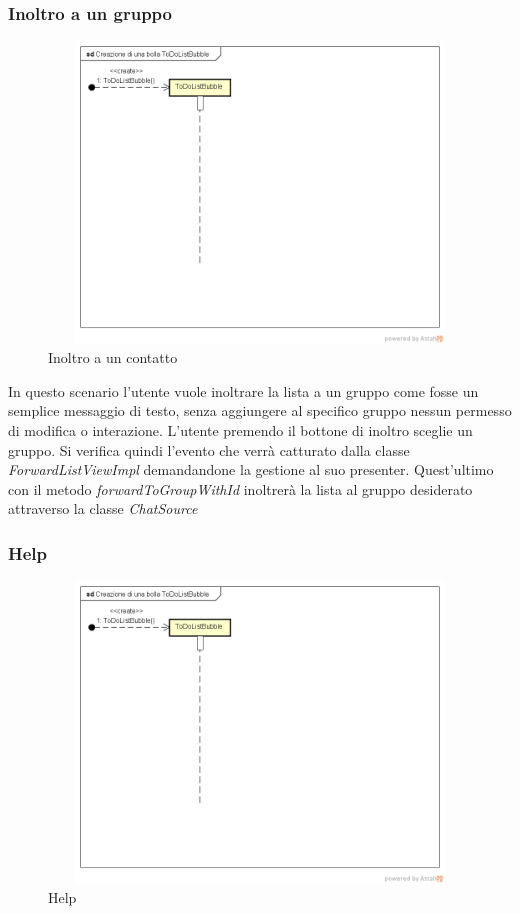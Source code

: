 \subsubsection{Inoltro a un gruppo}

\label{Inoltro a un contatto}
\begin{figure}[ht]
	\centering
	\includegraphics[width=12cm, height=8cm]{Sezioni/Diagrammi/img/Creazione di una bolla ToDoListBubble.png}
	\caption{Inoltro a un contatto}
	
\end{figure}

In questo scenario l'utente vuole inoltrare la lista a un gruppo come fosse un semplice messaggio di testo, senza aggiungere al specifico gruppo nessun permesso di modifica o interazione. L'utente premendo il bottone di inoltro sceglie un gruppo. Si verifica quindi l'evento che verrà catturato dalla classe \textit{ForwardListViewImpl} demandandone la gestione al suo presenter.
Quest'ultimo con il metodo \textit{forwardToGroupWithId} inoltrerà la lista al gruppo desiderato attraverso la classe \textit{ChatSource} 


\subsubsection{Help}

\label{Help}
\begin{figure}[ht]
	\centering
	\includegraphics[width=12cm, height=8cm]{Sezioni/Diagrammi/img/Creazione di una bolla ToDoListBubble.png}
	\caption{Help}
	
\end{figure}

